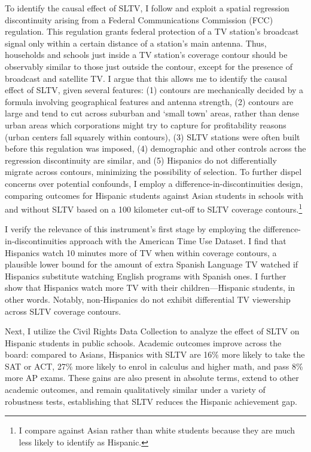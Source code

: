 \documentclass[11pt]{article}
\begin{document}
To identify the causal effect of SLTV, I follow \cite{velez_tuning_2019} and exploit a spatial regression discontinuity arising from a Federal Communications Commission (FCC) regulation. This regulation grants federal protection of a TV station’s broadcast signal only within a certain distance of a station’s main antenna. Thus, households and schools just inside a TV station's coverage contour should be observably similar to those just outside the contour, except for the presence of broadcast and satellite TV. I argue that this allows me to identify the causal effect of SLTV, given several features: (1) contours are mechanically decided by a formula involving geographical features and antenna strength, (2) contours are large and tend to cut across suburban and `small town' areas, rather than dense urban areas which corporations might try to capture for profitability reasons (urban centers fall squarely within contours), (3) SLTV stations were often built before this regulation was imposed, (4) demographic and other controls across the regression discontinuity are similar, and (5) Hispanics do not differentially migrate across contours, minimizing the possibility of selection. To further dispel concerns over potential confounds, I employ a difference-in-discontinuities design, comparing outcomes for Hispanic students against Asian students in schools with and without SLTV based on a 100 kilometer cut-off to SLTV coverage contours.\footnote{I compare against Asian rather than white students because they are much less likely to identify as Hispanic.} 

I verify the relevance of this instrument's first stage by employing the difference-in-discontinuities approach with the American Time Use Dataset. I find that Hispanics watch 10 minutes more of TV when within coverage contours, a plausible lower bound for the amount of extra Spanish Language TV watched if Hispanics substitute watching English programs with Spanish ones. I further show that Hispanics watch more TV with their children---Hispanic students, in other words. Notably, non-Hispanics do not exhibit differential TV viewership across SLTV coverage contours.
	
Next, I utilize the Civil Rights Data Collection to analyze the effect of SLTV on Hispanic students in public schools. Academic outcomes improve across the board: compared to Asians, Hispanics with SLTV are 16\% more likely to take the SAT or ACT, 27\% more likely to enrol in calculus and higher math, and pass 8\% more AP exams. These gains are also present in absolute terms, extend to other academic outcomes, and remain qualitatively similar under a variety of robustness tests, establishing that SLTV reduces the Hispanic achievement gap.
\end{document}
